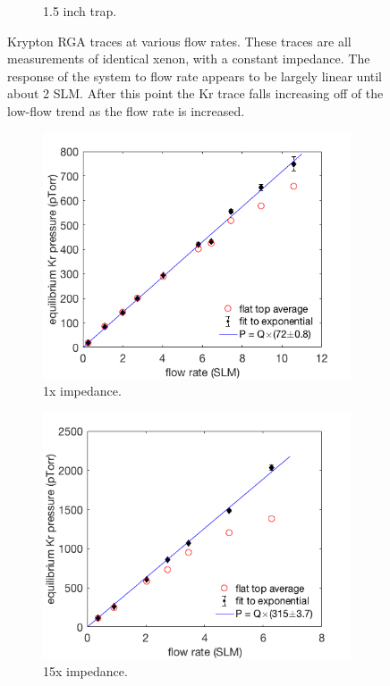 \documentclass[12pt]{article}
\begin{document}
\begin{figure}[h!]
\begin{subfigure}{0.5\textwidth}
  \caption{1.5 inch trap.}
  \label{fig:flow_traces_1p5}
\end{subfigure}
\caption{Krypton RGA traces at various flow rates. These traces are all measurements of identical xenon, with a constant impedance. The response of the system to flow rate appears to be largely linear until about 2 SLM. After this point the Kr trace falls increasing off of the low-flow trend as the flow rate is increased.} 
\label{fig:flow_traces}
\end{figure}


\begin{figure}[h!]
\centering
\begin{subfigure}{0.5\textwidth}
  \centering
  \includegraphics[width=\textwidth]{Figures/SLAC_FlowResponse_1x_linfit.png}
  \caption{1x impedance.}
  \label{fig:flowresponse1x}
\end{subfigure}%
\begin{subfigure}{0.5\textwidth}
  \centering
  \includegraphics[width=\textwidth]{Figures/SLAC_FlowResponse_15x_linplot.png}
  \caption{15x impedance.}
  \label{fig:flowresponse_15x}
\end{subfigure}
\caption{} 
\label{fig:flowresponse}
\end{figure}
\end{document}
